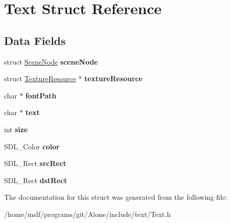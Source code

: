 \hypertarget{struct_text}{}\section{Text Struct Reference}
\label{struct_text}
\subsection*{Data Fields}
\begin{DoxyCompactItemize}
\item 
\hypertarget{struct_text_aca8025f56fb4ce20b974ec9a3292a9e4}{}\label{struct_text_aca8025f56fb4ce20b974ec9a3292a9e4} 
struct \hyperlink{struct_scene_node}{Scene\+Node} {\bfseries scene\+Node}
\item 
\hypertarget{struct_text_aedd0da0c072332f83e64105f8682bbdf}{}\label{struct_text_aedd0da0c072332f83e64105f8682bbdf} 
struct \hyperlink{struct_texture_resource}{Texture\+Resource} $\ast$ {\bfseries texture\+Resource}
\item 
\hypertarget{struct_text_aed16a68b0664f36f420ddefb18c7a640}{}\label{struct_text_aed16a68b0664f36f420ddefb18c7a640} 
char $\ast$ {\bfseries font\+Path}
\item 
\hypertarget{struct_text_a5633b1433389cec21ade3811bbe9ca5b}{}\label{struct_text_a5633b1433389cec21ade3811bbe9ca5b} 
char $\ast$ {\bfseries text}
\item 
\hypertarget{struct_text_a439227feff9d7f55384e8780cfc2eb82}{}\label{struct_text_a439227feff9d7f55384e8780cfc2eb82} 
int {\bfseries size}
\item 
\hypertarget{struct_text_a631bf4babe4c1825a2cdc0c19c2bd04f}{}\label{struct_text_a631bf4babe4c1825a2cdc0c19c2bd04f} 
S\+D\+L\+\_\+\+Color {\bfseries color}
\item 
\hypertarget{struct_text_a0717c803d1a988e69bf04032a0a1adb6}{}\label{struct_text_a0717c803d1a988e69bf04032a0a1adb6} 
S\+D\+L\+\_\+\+Rect {\bfseries src\+Rect}
\item 
\hypertarget{struct_text_a80f3f86b8f750b604dd07a40509447e0}{}\label{struct_text_a80f3f86b8f750b604dd07a40509447e0} 
S\+D\+L\+\_\+\+Rect {\bfseries dst\+Rect}
\end{DoxyCompactItemize}


The documentation for this struct was generated from the following file\+:\begin{DoxyCompactItemize}
\item 
/home/mslf/programs/git/\+Alone/include/text/Text.\+h\end{DoxyCompactItemize}

